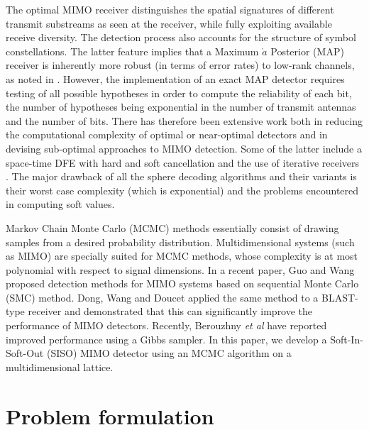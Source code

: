 \documentclass[pre,12pt,aps]{revtex4}
\begin{document}
 The optimal MIMO receiver distinguishes the 
spatial signatures of different transmit substreams 
as seen at the receiver, while fully exploiting 
available receive diversity. The detection process 
also accounts for the structure of symbol 
constellations. The latter feature implies that a 
Maximum $\grave{a}$ Posterior (MAP) receiver is inherently 
more robust (in terms of error rates) to low-rank 
channels, as noted in \cite{hsadsfh}. However, the 
implementation of an exact MAP detector requires 
testing of all possible hypotheses in order to compute 
the reliability of each bit, the number of 
hypotheses being exponential in the number 
of transmit antennas and the number of bits. 
There has therefore been extensive work both 
in reducing the computational complexity of 
optimal or near-optimal detectors \cite{bhhv,jbnslbmf,eateav}
and in devising sub-optimal approaches to 
MIMO detection. Some of the latter include a 
space-time DFE with hard \cite{pwwgjf} and soft 
cancellation\cite{wjckwcjmc} and the use of iterative 
receivers \cite{bhw,sm}. The major drawback of 
all the sphere decoding algorithms and their 
variants is their worst case complexity 
(which is exponential) and the problems encountered 
in computing soft values.

Markov Chain Monte Carlo (MCMC) methods essentially consist of
 drawing  samples 
from a desired probability distribution. Multidimensional 
systems (such as MIMO) are specially suited for MCMC methods, 
whose complexity is at most polynomial with respect to 
signal dimensions. In a recent paper, Guo and Wang \cite{gw} 
proposed detection methods for MIMO systems based on sequential 
Monte Carlo (SMC) method. Dong, Wang and Doucet \cite{dwd}
applied the same 
method to a BLAST-type receiver and demonstrated that this 
can significantly improve the performance of MIMO detectors. 
Recently, Berouzhny {\it et al} \cite{fbzs} have reported 
improved performance using a Gibbs sampler. In 
this paper, we develop a Soft-In-Soft-Out (SISO) 
MIMO detector using an MCMC algorithm on a 
multidimensional lattice. 

\section{Problem formulation}
\end{document}
